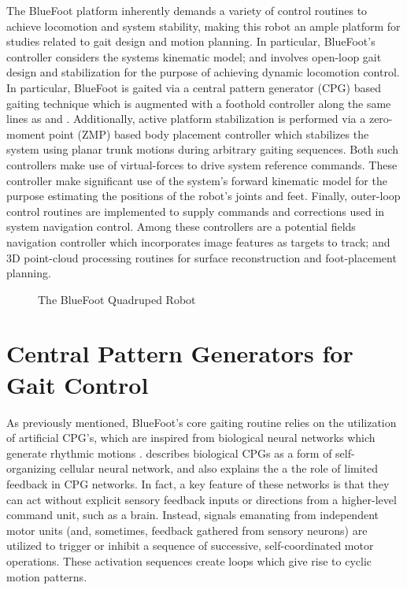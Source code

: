 		The BlueFoot platform inherently demands a variety of control routines to achieve locomotion and system stability, making this robot an ample platform for studies related to gait design and motion planning. In particular, BlueFoot's controller considers the systems kinematic model; and involves open-loop gait design and stabilization for the purpose of achieving dynamic locomotion control. In particular, BlueFoot is gaited via a central pattern generator (CPG) based gaiting technique which is augmented with a foothold controller along the same lines as \cite{Ajallooeian2013} and \cite{Rutishauser2008}. Additionally, active platform stabilization is performed via a zero-moment point (ZMP) based body placement controller which stabilizes the system using planar trunk motions during arbitrary gaiting sequences. Both such controllers make use of virtual-forces to drive system reference commands. These controller make significant use of the system's forward kinematic model for the purpose estimating the positions of the robot's joints and feet. Finally, outer-loop control routines are implemented to supply commands and corrections used in system navigation control. Among these controllers are a potential fields navigation controller which incorporates image features as targets to track; and 3D point-cloud processing routines for surface reconstruction and foot-placement planning.
	
	\begin{figure}[h!]
		\centering
		\caption{The BlueFoot Quadruped Robot}
		\label{fig::bluefoot_glamour}
	\end{figure}

	\section{Central Pattern Generators for Gait Control}

		As previously mentioned, BlueFoot's core gaiting routine relies on the utilization of artificial CPG's, which are inspired from biological neural networks which generate rhythmic motions \cite{Ijspeert2008}. \cite{Arena2000} describes biological CPGs as a form of self-organizing cellular neural network, and also explains the a the role of limited feedback in CPG networks. In fact, a key feature of these networks is that they can act without explicit sensory feedback inputs or directions from a higher-level command unit, such as a brain. Instead, signals emanating from independent motor units (and, sometimes, feedback gathered from sensory neurons) are utilized to trigger or inhibit a sequence of successive, self-coordinated motor operations. These activation sequences create loops which give rise to cyclic motion patterns. 

